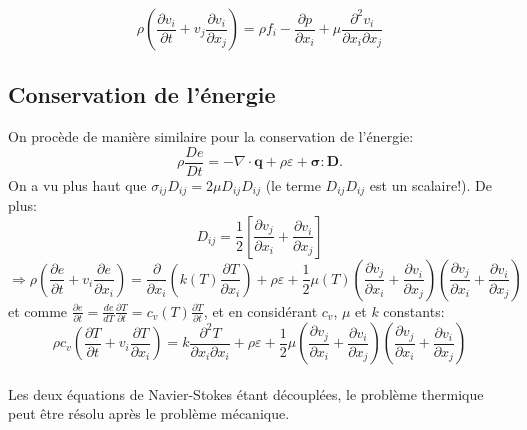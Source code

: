 $$\boxed{\rho\left(\frac{\partial v_i}{\partial t}+v_j\frac{\partial v_i}{\partial x_j}\right)=\rho f_i-\frac{\partial p}{\partial x_i}+\mu\frac{\partial^2v_i}{\partial x_i\partial x_j}} $$

\subsection*{Conservation de l'énergie}
On procède de manière similaire pour la conservation de l'énergie:
$$\rho\frac{De}{Dt}=-\nabla\cdot\textbf{q}+\rho\varepsilon+\boldsymbol{\sigma}:\textbf{D}.$$
On a vu plus haut que $\sigma_{ij}D_{ij}=2\mu D_{ij}D_{ij}$ (le terme $D_{ij}D_{ij}$ est un scalaire!). De plus: 
$$D_{ij}=\frac{1}{2}\left[\frac{\partial v_j}{\partial x_i}+\frac{\partial v_i}{\partial x_j}\right]$$
$$\Rightarrow \rho\left(\frac{\partial e}{\partial t}+v_i\frac{\partial e}{\partial x_i}\right)=\frac{\partial}{\partial x_i}\left(k(T)\frac{\partial T}{\partial x_i}\right)+\rho\varepsilon+\frac{1}{2}\mu(T)\left(\frac{\partial v_j}{\partial x_i}+\frac{\partial v_i}{\partial x_j}\right)\left(\frac{\partial v_j}{\partial x_i}+\frac{\partial v_i}{\partial x_j}\right)$$
et comme $\frac{\partial e}{\partial t}=\frac{de}{dT}\frac{\partial T}{\partial t}=c_v(T)\frac{\partial T}{\partial t}$, et en considérant $c_v$, $\mu$ et $k$ constants:
$$\boxed{\rho c_v\left(\frac{\partial T}{\partial t}+v_i\frac{\partial T}{\partial x_i}\right)=k\frac{\partial^2 T}{\partial x_i\partial x_i}+\rho\varepsilon+\frac{1}{2}\mu\left(\frac{\partial v_j}{\partial x_i}+\frac{\partial v_i}{\partial x_j}\right)\left(\frac{\partial v_j}{\partial x_i}+\frac{\partial v_i}{\partial x_j}\right)}$$
\paragraph{}
Les deux équations de Navier-Stokes étant découplées, le problème thermique peut être résolu après le problème mécanique. 
